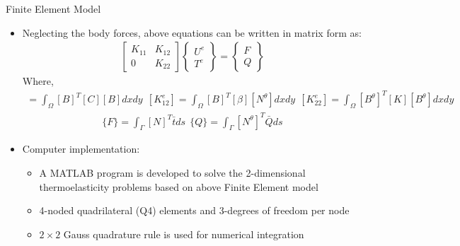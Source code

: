 \documentclass{beamer}
\begin{document}
\begin{frame}[t,fragile]{Finite Element Model}
    \vspace{-.3cm}
    \footnotesize
    \begin{itemize}
          \item Neglecting the body forces, above equations can be written in matrix form as: 
    \begin{align*}
\begin{bmatrix}
    K_{11} & K_{12} \\
    0 & K_{22}
\end{bmatrix}
\begin{Bmatrix}
    U^e\\ T^e
\end{Bmatrix}=
\begin{Bmatrix}
    F\\ Q
\end{Bmatrix}
\end{align*}  
Where,
\vspace{-.2cm}
    \scriptsize 
\begin{align*}
    [K_{11}^e]=\int_{\Omega}[B]^T[C][B]dxdy\ \
    [K_{12}^e]=\int_{\Omega}[B]^T[\beta][N^{\theta}]dxdy\ \
    [K_{22}^e]=\int_{\Omega}[B^{\theta}]^T[K][B^{\theta}]dxdy
\end{align*}
\vspace{-.5cm}
\begin{align*}
    \{F\}=\int_\Gamma [N]^T{\bar{t}}ds\ \
    \{Q\}=\int_\Gamma [N^{\theta}]^T\bar{Q}ds
\end{align*}  
\item \large{Computer implementation:}
    \begin{itemize}
\footnotesize
         \item A MATLAB program is developed to solve the 2-dimensional thermoelasticity problems based on above Finite Element model 
         \item 4-noded quadrilateral (Q4) elements and 3-degrees of freedom per node 
         \item  $2\times 2$ Gauss quadrature rule is used for numerical integration
    \end{itemize}
\end{itemize}
\end{frame}
\end{document}
